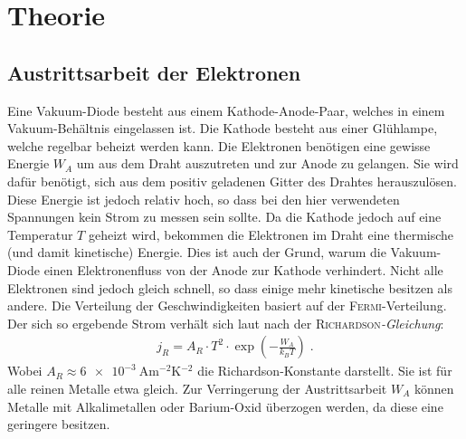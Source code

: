 \documentclass[12pt,a4paper,titlepage,headinclude,bibtotoc]{scrartcl}
\begin{document}
\section{Theorie}
\label{sec:theorie}
\subsection{Austrittsarbeit der Elektronen}
Eine Vakuum-Diode besteht aus einem Kathode-Anode-Paar, welches in einem Vakuum-Behältnis eingelassen ist.
Die Kathode besteht aus einer Glühlampe, welche regelbar beheizt werden kann.
Die Elektronen benötigen eine gewisse Energie $W_A$ um aus dem Draht auszutreten und zur Anode zu gelangen.
Sie wird dafür benötigt, sich aus dem positiv geladenen Gitter des Drahtes herauszulösen.
Diese Energie ist jedoch relativ hoch, so dass bei den hier verwendeten Spannungen kein Strom zu messen sein sollte.
Da die Kathode jedoch auf eine Temperatur $T$ geheizt wird, bekommen die Elektronen im Draht eine thermische (und damit kinetische) Energie.
Dies ist auch der Grund, warum die Vakuum-Diode einen Elektronenfluss von der Anode zur Kathode verhindert.
Nicht alle Elektronen sind jedoch gleich schnell, so dass einige mehr kinetische besitzen als andere.
Die Verteilung der Geschwindigkeiten basiert auf der \textsc{Fermi}-Verteilung.
Der sich so ergebende Strom verhält sich laut \cite[S. 463]{gerthsen} nach der \textsc{Richardson}\emph{-Gleichung}:
\begin{align}
	j_R=A_R\cdot T^{2}\cdot \exp\left(-\frac{W_A}{k_BT}\right)\label{eq:richardson}\; .
\end{align}
Wobei $A_R\approx \SI{6e-3}{\ampere\meter^{-2}\kelvin^{-2}}$ die Richardson-Konstante darstellt.
Sie ist für alle reinen Metalle etwa gleich.
Zur Verringerung der Austrittsarbeit $W_A$ können Metalle mit Alkalimetallen oder Barium-Oxid überzogen werden, da diese eine geringere besitzen.


                                                                                                                                                                      
\end{document}
